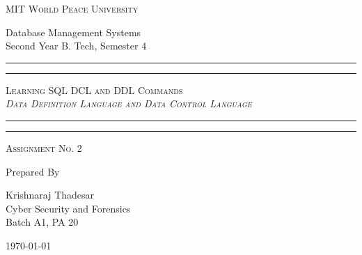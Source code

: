 \documentclass[11pt]{article}
\begin{document}
\begin{titlepage}
	\centering


	\huge\textsc{
		MIT World Peace University
	}\\

	\vspace{0.75\baselineskip} %

	\LARGE{
		Database Management Systems\\
		Second Year B. Tech, Semester 4
	}

	\vfill %


	\rule{\textwidth}{1.6pt}\vspace*{-\baselineskip}\vspace*{2pt}
	\rule{\textwidth}{0.6pt}
	\vspace{0.75\baselineskip} %



	\huge{\textsc{
			Learning SQL DCL and DDL Commands\\
			\textit{Data Definition Language and Data Control Language}
		}} \\



	\vspace{0.5\baselineskip} %
	\rule{\textwidth}{0.6pt}\vspace*{-\baselineskip}\vspace*{2.8pt}
	\rule{\textwidth}{1.6pt}

	\vspace{1\baselineskip} %


	\LARGE\textsc{
		Assignment No. 2
	} %
	\vfill


	Prepared By
	\vspace{0.5\baselineskip} %

	\Large{
		Krishnaraj Thadesar \\
		Cyber Security and Forensics\\
		Batch A1, PA 20
	}


	\vspace{0.5\baselineskip} %
	\today

\end{titlepage}
\end{document}
